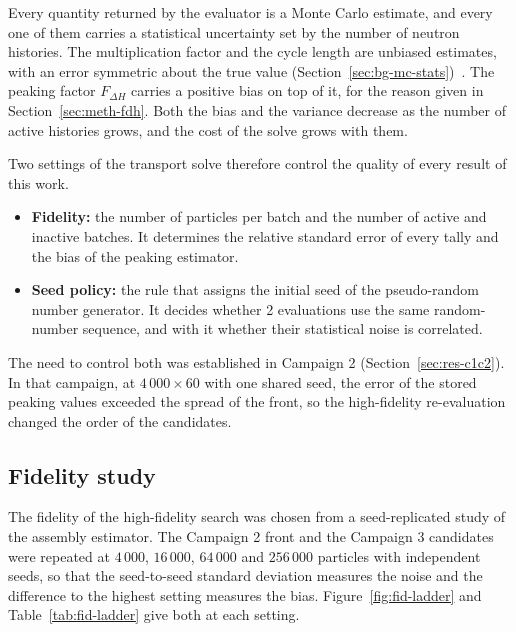 Every quantity returned by the evaluator is a Monte Carlo estimate,
and every one of them carries a statistical uncertainty set by the
number of neutron histories. The multiplication factor and the cycle length
are unbiased estimates, with an error symmetric about the true value
(Section~\ref{sec:bg-mc-stats})~\cite{lux_koblinger_1991}. The peaking
factor $F_{\Delta H}$ carries a positive bias on top of it, for the
reason given in Section~\ref{sec:meth-fdh}. Both the bias and the
variance decrease as the number of active histories grows, and the cost of
the solve grows with them.

Two settings of the transport solve therefore control the quality of
every result of this work.

\begin{itemize}
  \item \textbf{Fidelity:} the number of particles per batch and the
        number of active and inactive batches. It determines the relative standard error of every tally and the bias of the peaking
        estimator.

  \item \textbf{Seed policy:} the rule that assigns the initial seed of
        the pseudo-random number generator. It decides whether 2
        evaluations use the same random-number sequence, and
        with it whether their statistical noise is correlated.
\end{itemize}

The need to control both was established in Campaign 2
(Section~\ref{sec:res-c1c2}). In that campaign, at $4\,000\times60$ with
one shared seed, the error of the stored peaking values exceeded the
spread of the front, so the high-fidelity re-evaluation changed the order
of the candidates.

\subsection{Fidelity study}
\label{sec:meth-fid-ladder}

The fidelity of the high-fidelity search was chosen from a
seed-replicated study of the assembly estimator.
\label{sec:res-c3-fidelity}
The Campaign 2 front and the Campaign 3 candidates were repeated at
$4\,000$, $16\,000$, $64\,000$ and $256\,000$ particles with
independent seeds, so that the seed-to-seed standard deviation measures
the noise and the difference to the highest setting measures the bias.
Figure~\ref{fig:fid-ladder} and Table~\ref{tab:fid-ladder} give both at
each setting.

